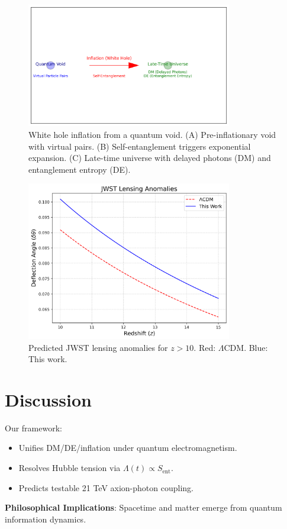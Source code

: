 \documentclass[12pt, a4paper]{article}
\begin{document}
\begin{figure}[t]  
\centering  
\includegraphics[width=0.8\textwidth]{white_hole_inflation.png}  
\caption{White hole inflation from a quantum void. (A) Pre-inflationary void with virtual pairs. (B) Self-entanglement triggers exponential expansion. (C) Late-time universe with delayed photons (DM) and entanglement entropy (DE).}  
\label{fig:white_hole}  
\end{figure}  

\begin{figure}[t]  
\centering  
\includegraphics[width=0.8\textwidth]{jwst_lensing.png}  
\caption{Predicted JWST lensing anomalies for \( z > 10 \). Red: \(\Lambda\)CDM. Blue: This work.}  
\label{fig:lensing_anomaly}  
\end{figure}  

\section{Discussion}  
\label{sec:discussion}  
Our framework:  
\begin{itemize}  
\item Unifies DM/DE/inflation under quantum electromagnetism.  
\item Resolves Hubble tension via \( \Lambda(t) \propto S_{\text{ent}} \).  
\item Predicts testable 21 TeV axion-photon coupling.  
\end{itemize}  
\textbf{Philosophical Implications}: Spacetime and matter emerge from quantum information dynamics.  
\end{document}
